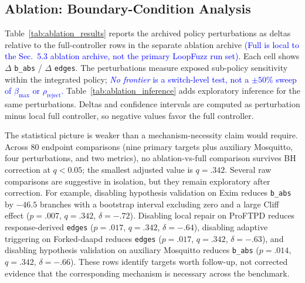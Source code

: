 \documentclass[final,5p,times,number]{elsarticle}
\begin{document}
\subsection{Ablation: Boundary-Condition Analysis}

Table~\ref{tab:ablation_results} reports the archived policy perturbations as deltas relative to the full-controller rows in the separate ablation archive \textcolor{blue}{(Full is local to the Sec.~5.3 ablation archive, not the primary LoopFuzz run set).} Each cell shows $\Delta$ \texttt{b\_abs} / $\Delta$ \texttt{edges}. The perturbations measure exposed sub-policy sensitivity within the integrated policy; \textcolor{blue}{\emph{No frontier} is a switch-level test, not a $\pm50\%$ sweep of $\beta_{\max}$ or $\rho_{\mathrm{reject}}$.} Table~\ref{tab:ablation_inference} adds exploratory inference for the same perturbations. Deltas and confidence intervals are computed as perturbation minus local full controller, so negative values favor the full controller.

The statistical picture is weaker than a mechanism-necessity claim would require. Across 80 endpoint comparisons (nine primary targets plus auxiliary Mosquitto, four perturbations, and two metrics), no ablation-vs-full comparison survives BH correction at $q<0.05$; the smallest adjusted value is $q=.342$. Several raw comparisons are suggestive in isolation, but they remain exploratory after correction. For example, disabling hypothesis validation on Exim reduces \texttt{b\_abs} by $-46.5$ branches with a bootstrap interval excluding zero and a large Cliff effect ($p=.007$, $q=.342$, $\delta=-.72$). Disabling local repair on ProFTPD reduces response-derived \texttt{edges} ($p=.017$, $q=.342$, $\delta=-.64$), disabling adaptive triggering on Forked-daapd reduces \texttt{edges} ($p=.017$, $q=.342$, $\delta=-.63$), and disabling hypothesis validation on auxiliary Mosquitto reduces \texttt{b\_abs} ($p=.014$, $q=.342$, $\delta=-.66$). These rows identify targets worth follow-up, not corrected evidence that the corresponding mechanism is necessary across the benchmark.
\end{document}
